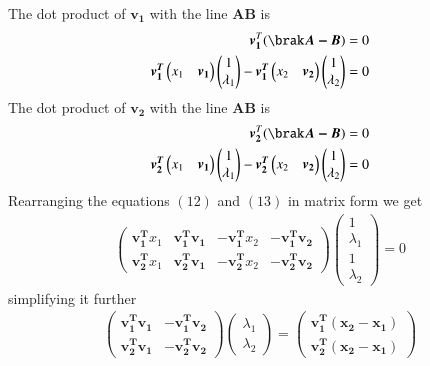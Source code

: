\documentclass[journal,12pt,twocolumn]{IEEEtran}
\begin{document}
The dot product of $\bm{v_1}$ with the line $\bm{AB}$ is
\begin{align}
    \bm{v_1}^T(\brak\bm{A-B})=0\notag\\
    \bm{v_1^T}\begin{pmatrix}x_1 & \bm{v_1}\end{pmatrix}\begin{pmatrix}1 \\ \lambda_1\end{pmatrix}-\bm{v_1^T}\begin{pmatrix}x_2 & \bm{v_2}\end{pmatrix}\begin{pmatrix}1 \\ \lambda_2\end{pmatrix}=0
\end{align}
The dot product of $\bm{v_2}$ with the line $\bm{AB}$ is\\
\begin{align}
    \bm{v_2}^T(\brak\bm{A-B})=0\notag\\
    \bm{v_2^T}\begin{pmatrix}x_1 & \bm{v_1}\end{pmatrix}\begin{pmatrix}1 \\ \lambda_1\end{pmatrix}-\bm{v_2^T}\begin{pmatrix}x_2 & \bm{v_2}\end{pmatrix}\begin{pmatrix}1 \\ \lambda_2\end{pmatrix}=0
\end{align}
Rearranging the equations $(12)$ and $(13)$ in matrix form we get\\
\begin{align}
    \begin{pmatrix}\bm{v_1^T}x_1 & \bm{v_1^T}\bm{v_1} & -\bm{v_1^T}x_2 & -\bm{v_1^T}\bm{v_2}\\\bm{v_2^T}x_1 & \bm{v_2^T}\bm{v_1} & -\bm{v_2^T}x_2 & -\bm{v_2^T}\bm{v_2}\end{pmatrix}\begin{pmatrix}1\\\lambda_1\\1\\\lambda_2\end{pmatrix}=0
\end{align}
simplifying it further\\
\begin{align}
    \begin{pmatrix}\bm{v_1^T}\bm{v_1} & -\bm{v_1^T}\bm{v_2}\\\bm{v_2^T}\bm{v_1} &  -\bm{v_2^T}\bm{v_2}\end{pmatrix}\begin{pmatrix}\lambda_1\\\lambda_2\end{pmatrix}=\begin{pmatrix}\bm{v_1^T}\bm{(x_2-x_1)}\\\bm{v_2^T}\bm{(x_2-x_1)}\end{pmatrix}
\end{align}
\end{document}
